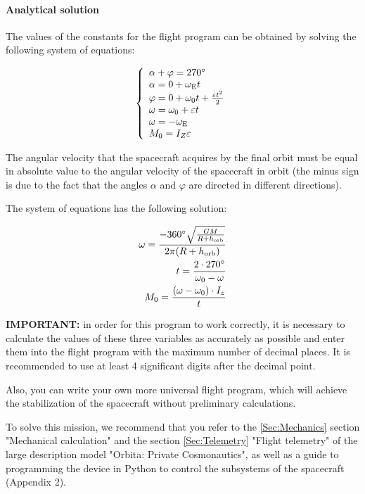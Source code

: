 \documentclass[12pt,a4paper]{article}
\begin{document}
\paragraph{Analytical solution}

The values of the constants for the flight program can be obtained by solving the following system of equations:

\begin{eqnarray}
\left\{
  \begin{array}{l}
    \alpha + \varphi = 270 \degree\\
    \alpha = 0 + \omega_{\text{E}} t\\
    \varphi = 0 + \omega_0 t + \frac{\varepsilon t^2}{2}\\
    \omega = \omega_0 + \varepsilon t\\
    \omega = -\omega_{\text{E}}\\
    M_0 = I_Z \varepsilon
  \end{array}
\right.
\end{eqnarray}

The angular velocity that the spacecraft acquires by the final orbit must be equal in absolute value to the angular velocity of the spacecraft in orbit (the minus sign is due to the fact that the angles $\alpha$ and $\varphi$ are directed in different directions).

The system of equations has the following solution:

\begin{eqnarray}
  \omega = \frac{-360 \degree \sqrt{\frac{G M}{R + h_{\text{orb}}}}}{2 \pi (R + h_{\text{orb}})}\\
  t = \frac{2 \cdot 270 \degree}{\omega_0 - \omega}\\
  M_0 = \frac{(\omega - \omega_0) \cdot I_z}{t}
\end{eqnarray}

\textbf{IMPORTANT:} in order for this program to work correctly, it is necessary to calculate the values of these three variables as accurately as possible and enter them into the flight program with the maximum number of decimal places. It is recommended to use at least 4 significant digits after the decimal point.

Also, you can write your own more universal flight program, which will achieve the stabilization of the spacecraft without preliminary calculations.

To solve this mission, we recommend that you refer to the \ref{Sec:Mechanics} section "Mechanical calculation" and the section \ref{Sec:Telemetry} "Flight telemetry" of the large description
model "Orbita: Private Cosmonautics", as well as a guide to programming the device in Python to control the subsystems of the spacecraft (Appendix 2).
\end{document}

